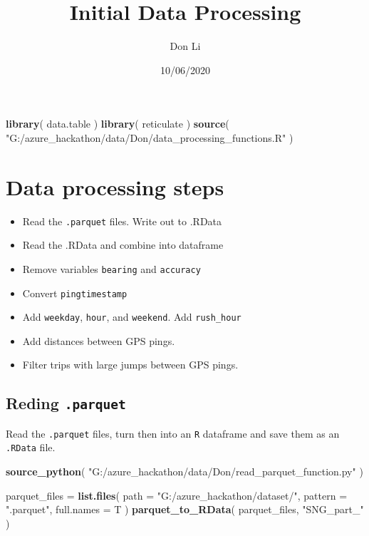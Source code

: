 \documentclass[]{article}
\title{Initial Data Processing}
\author{Don Li}
\date{10/06/2020}
\newenvironment{Shaded}{\begin{snugshade}}{\end{snugshade}}
\newcommand{\DataTypeTok}[1]{\textcolor[rgb]{0.13,0.29,0.53}{#1}}
\newcommand{\KeywordTok}[1]{\textcolor[rgb]{0.13,0.29,0.53}{\textbf{#1}}}
\newcommand{\NormalTok}[1]{#1}
\newcommand{\StringTok}[1]{\textcolor[rgb]{0.31,0.60,0.02}{#1}}
\begin{document}
\maketitle

\begin{Shaded}
\begin{Highlighting}[]
\KeywordTok{library}\NormalTok{( data.table )}
\KeywordTok{library}\NormalTok{( reticulate )}
\KeywordTok{source}\NormalTok{( }\StringTok{"G:/azure_hackathon/data/Don/data_processing_functions.R"}\NormalTok{ )}
\end{Highlighting}
\end{Shaded}

\hypertarget{data-processing-steps}{%
\section{Data processing steps}\label{data-processing-steps}}

\begin{itemize}
\item
  Read the \texttt{.parquet} files. Write out to .RData
\item
  Read the .RData and combine into dataframe
\item
  Remove variables \texttt{bearing} and \texttt{accuracy}
\item
  Convert \texttt{pingtimestamp}
\item
  Add \texttt{weekday}, \texttt{hour}, and \texttt{weekend}. Add
  \texttt{rush\_hour}
\item
  Add distances between GPS pings.
\item
  Filter trips with large jumps between GPS pings.
\end{itemize}

\hypertarget{reding-.parquet}{%
\subsection{\texorpdfstring{Reding
\texttt{.parquet}}{Reding .parquet}}\label{reding-.parquet}}

Read the \texttt{.parquet} files, turn then into an \texttt{R} dataframe
and save them as an \texttt{.RData} file.

\begin{Shaded}
\begin{Highlighting}[]
\KeywordTok{source_python}\NormalTok{( }\StringTok{"G:/azure_hackathon/data/Don/read_parquet_function.py"}\NormalTok{ )}

\NormalTok{parquet_files =}\StringTok{ }\KeywordTok{list.files}\NormalTok{( }\DataTypeTok{path =} \StringTok{"G:/azure_hackathon/dataset/"}\NormalTok{,}
    \DataTypeTok{pattern =} \StringTok{".parquet"}\NormalTok{, }\DataTypeTok{full.names =}\NormalTok{ T )}
\KeywordTok{parquet_to_RData}\NormalTok{( parquet_files, }\StringTok{"SNG_part_"}\NormalTok{ )}
\end{Highlighting}
\end{Shaded}
\end{document}
